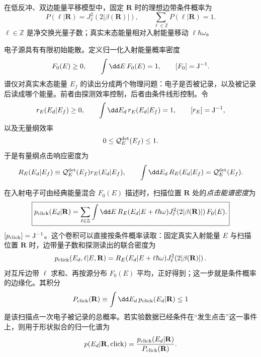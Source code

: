 在低反冲、双边能量平移模型中，固定 $\mathbf R$ 时的理想边带条件概率为
\begin{equation*}
P(\ell|\mathbf R)
=J_\ell^2(2|\beta(\mathbf R)|),
\qquad
\sum_{\ell\in\mathbb Z}P(\ell|\mathbf R)=1.
\end{equation*}
$\ell\in\mathbb Z$ 是净交换光量子数；真实末态能量相对入射能量移动 $\ell\hbar\omega$。

电子源具有有限初始能散。定义归一化入射能量概率密度
\begin{equation*}
F_0(E)\ge0,
\qquad
\int\dd E\,F_0(E)=1,
\qquad
[F_0]={\rm J^{-1}}.
\end{equation*}
谱仪对真实末态能量 $E_f$ 的读出分成两个物理问题：电子是否被记录，以及被记录后读成哪个能量。前者由探测效率控制，后者由条件线形控制。令
\begin{equation*}
r_E(E_d|E_f)\ge0,
\qquad
\int\dd E_d\,r_E(E_d|E_f)=1,
\qquad
[r_E]={\rm J^{-1}},
\end{equation*}
以及无量纲效率
\begin{equation*}
0\le\mathcal Q_E^{\rm det}(E_f)\le1.
\end{equation*}
于是有量纲点击响应密度为
\begin{equation*}
R_E(E_d|E_f)
\equiv\mathcal Q_E^{\rm det}(E_f)r_E(E_d|E_f),
\qquad
\int\dd E_d\,R_E(E_d|E_f)=\mathcal Q_E^{\rm det}(E_f).
\end{equation*}

在入射电子可由经典能量混合 $F_0(E)$ 描述时，扫描位置 $\mathbf R$ 处的\emph{点击能谱密度}为
\begin{equation}
\boxed{
 p_{\rm click}(E_d|\mathbf R)
 =\sum_{\ell\in\mathbb Z}\int\dd E\,
 R_E(E_d|E+\ell\hbar\omega)
 J_\ell^2\!\left(2|\beta(\mathbf R)|\right)
 F_0(E).}
\label{eq:pinem-spatial-detector-forward-dp19}
\end{equation}
$[p_{\rm click}]={\rm J^{-1}}$。这个卷积可以直接按条件概率读取：固定真实入射能量 $E$ 与扫描位置 $\mathbf R$ 时，边带量子数和探测读出的联合密度为
\begin{equation*}
p_{\rm click}(E_d,\ell|E,\mathbf R)
=R_E(E_d|E+\ell\hbar\omega)
J_\ell^2\!\left(2|\beta(\mathbf R)|\right).
\end{equation*}
对互斥边带 $\ell$ 求和、再按源分布 $F_0(E)$ 平均，正好得到；这一步就是条件概率的边缘化。其积分
\begin{equation*}
P_{\rm click}(\mathbf R)
\equiv\int\dd E_d\,p_{\rm click}(E_d|\mathbf R)
\le1
\end{equation*}
是该扫描点一次电子被记录的总概率。若实验数据已经条件在“发生点击”这一事件上，则用于形状拟合的归一化谱为
\begin{equation*}
p(E_d|\mathbf R,{\rm click})
=\frac{p_{\rm click}(E_d|\mathbf R)}{P_{\rm click}(\mathbf R)}.
\end{equation*}

